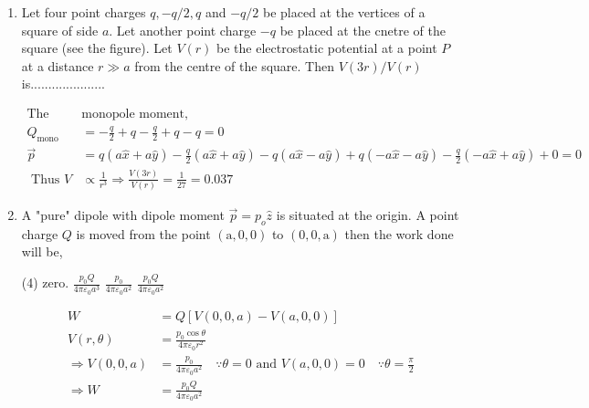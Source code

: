 \begin{enumerate} [label=\color{ocre}\textbf{\arabic*.}]
\begin{answer}
	\begin{align*}
	\vec{E}(r, \theta)&=\frac{p}{4 \pi \varepsilon_{0} r^{3}}(2 \cos \theta \hat{r}+\sin \theta \hat{\theta}) \\
	\tan \alpha&=\frac{E_{\theta}}{E_{r}}=\frac{1}{2} \tan \theta \quad \because \alpha=90-\theta \Rightarrow \cot \theta=\frac{1}{2} \tan \theta \\
	\Rightarrow \tan ^{2} \theta&=2 \Rightarrow \theta=\tan ^{-1} \sqrt{2}
	\end{align*}
	
\end{answer}
\item Let four point charges $q,-q / 2, q$ and $-q / 2$ be placed at the vertices of a square of
side $a$. Let another point charge $-q$ be placed at the cnetre of the square (see the figure).
Let $V(r)$ be the electrostatic potential at a point $P$ at a distance $r \gg a$ from the centre of
the square. Then $V(3 r) / V(r)$ is.....................
\begin{answer} 
   \begin{align*}
   	\text{The }&\text{monopole moment,}\\
   Q_{\text {mono }}&=-\frac{q}{2}+q-\frac{q}{2}+q-q=0\\
	\vec{p}&=q(a \hat{x}+a \hat{y})-\frac{q}{2}(a \hat{x}+a \hat{y})-q(a \hat{x}-a \hat{y})+q(-a \hat{x}-a \hat{y})-\frac{q}{2}(-a \hat{x}+a \hat{y})+0=0 \\
	\text { Thus } V &\propto \frac{1}{r^{3}} \Rightarrow \frac{V(3 r)}{V(r)}=\frac{1}{27}=0.037
	\end{align*}
	
\end{answer}
\item A "pure" dipole with dipole moment $\vec{p}=p_{o} \hat{z}$ is situated at the origin. A point charge $Q$ is
moved from the point $(\mathrm{a}, 0,0)$ to $(0,0, \mathrm{a})$ then the work done will be,
\begin{tasks}(4)
	\task[\textbf{a.}]  zero. 
	\task[\textbf{b.}]$\frac{p_{0} Q}{4 \pi \varepsilon_{0} a^{3}}$
	\task[\textbf{c.}] $\frac{p_{0}}{4 \pi \varepsilon_{0} a^{2}}$
	\task[\textbf{d.}] $\frac{p_{0} Q}{4 \pi \varepsilon_{0} a^{2}}$
\end{tasks}
\begin{answer}
	\begin{align*}
    W&=Q[V(0,0, a)-V(a, 0,0)]\\
	V(r, \theta)&=\frac{p_{0} \cos \theta}{4 \pi \varepsilon_{0} r^{2}}\\ \Rightarrow V(0,0, a)&=\frac{p_{0}}{4 \pi \varepsilon_{0} a^{2}} \quad \because \theta=0 \text { and } V(a, 0,0)=0 \quad \because \theta=\frac{\pi}{2}\\
	\Rightarrow W&=\frac{p_{0} Q}{4 \pi \varepsilon_{0} a^{2}}
	\end{align*}
	
\end{answer}

\end{enumerate}




